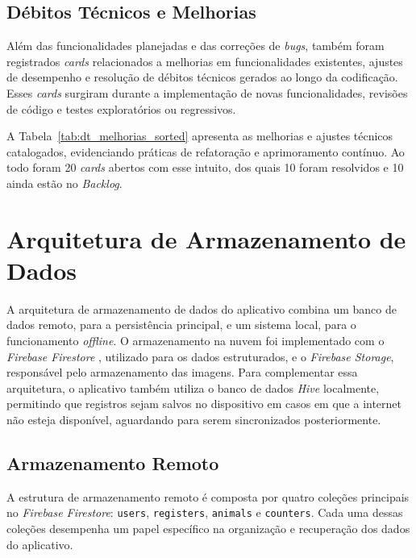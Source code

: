 

\subsection{Débitos Técnicos e Melhorias}
Além das funcionalidades planejadas e das correções de \textit{bugs}, também foram registrados \textit{cards} relacionados a melhorias em funcionalidades existentes, ajustes de desempenho e resolução de débitos técnicos gerados ao longo da codificação. Esses \textit{cards} surgiram durante a implementação de novas funcionalidades, revisões de código e testes exploratórios ou regressivos.

A Tabela~\ref{tab:dt_melhorias_sorted} apresenta as melhorias e ajustes técnicos catalogados, 
evidenciando práticas de refatoração e aprimoramento contínuo. Ao todo foram 20 \textit{cards} abertos com esse intuito, dos quais 10 foram resolvidos e 10 ainda estão no \textit{Backlog}.



\section{Arquitetura de Armazenamento de Dados}\label{sec:arquitetura_dados}

A arquitetura de armazenamento de dados do aplicativo combina um banco de dados remoto, para a persistência principal, e um sistema local, para o funcionamento \textit{offline}. O armazenamento na nuvem foi implementado com o \textit{Firebase Firestore} , utilizado para os dados estruturados, e o \textit{Firebase Storage}, responsável pelo armazenamento das imagens. Para complementar essa arquitetura, o aplicativo também utiliza o banco de dados \textit{Hive} localmente, permitindo que registros sejam salvos no dispositivo em casos em que a internet não esteja disponível, aguardando para serem sincronizados posteriormente.

\subsection{Armazenamento Remoto}\label{subsec:armazenamento_remoto}

A estrutura de armazenamento remoto é composta por quatro coleções principais no \textit{Firebase Firestore}: \texttt{users}, \texttt{registers}, \texttt{animals} e \texttt{counters}. Cada uma dessas coleções desempenha um papel específico na organização e recuperação dos dados do aplicativo.

